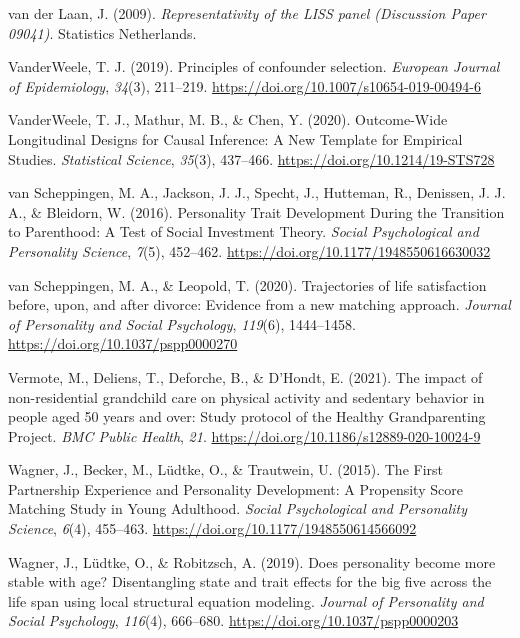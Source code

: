 \documentclass[
  english,
  man, noextraspace,floatsintext]{apa7}
\begin{document}
\leavevmode\hypertarget{ref-vanderlaanRepresentativityLISSPanel2009}{}%
van der Laan, J. (2009). \emph{Representativity of the LISS panel (Discussion Paper 09041)}. Statistics Netherlands.

\leavevmode\hypertarget{ref-vanderweelePrinciplesConfounderSelection2019}{}%
VanderWeele, T. J. (2019). Principles of confounder selection. \emph{European Journal of Epidemiology}, \emph{34}(3), 211--219. \url{https://doi.org/10.1007/s10654-019-00494-6}

\leavevmode\hypertarget{ref-vanderweeleOutcomeWideLongitudinalDesigns2020}{}%
VanderWeele, T. J., Mathur, M. B., \& Chen, Y. (2020). Outcome-Wide Longitudinal Designs for Causal Inference: A New Template for Empirical Studies. \emph{Statistical Science}, \emph{35}(3), 437--466. \url{https://doi.org/10.1214/19-STS728}

\leavevmode\hypertarget{ref-vanscheppingenPersonalityTraitDevelopment2016}{}%
van Scheppingen, M. A., Jackson, J. J., Specht, J., Hutteman, R., Denissen, J. J. A., \& Bleidorn, W. (2016). Personality Trait Development During the Transition to Parenthood: A Test of Social Investment Theory. \emph{Social Psychological and Personality Science}, \emph{7}(5), 452--462. \url{https://doi.org/10.1177/1948550616630032}

\leavevmode\hypertarget{ref-vanscheppingenTrajectoriesLifeSatisfaction2020}{}%
van Scheppingen, M. A., \& Leopold, T. (2020). Trajectories of life satisfaction before, upon, and after divorce: Evidence from a new matching approach. \emph{Journal of Personality and Social Psychology}, \emph{119}(6), 1444--1458. \url{https://doi.org/10.1037/pspp0000270}

\leavevmode\hypertarget{ref-vermoteImpactNonresidentialGrandchild2021a}{}%
Vermote, M., Deliens, T., Deforche, B., \& D'Hondt, E. (2021). The impact of non-residential grandchild care on physical activity and sedentary behavior in people aged 50 years and over: Study protocol of the Healthy Grandparenting Project. \emph{BMC Public Health}, \emph{21}. \url{https://doi.org/10.1186/s12889-020-10024-9}

\leavevmode\hypertarget{ref-wagnerFirstPartnershipExperience2015}{}%
Wagner, J., Becker, M., Lüdtke, O., \& Trautwein, U. (2015). The First Partnership Experience and Personality Development: A Propensity Score Matching Study in Young Adulthood. \emph{Social Psychological and Personality Science}, \emph{6}(4), 455--463. \url{https://doi.org/10.1177/1948550614566092}

\leavevmode\hypertarget{ref-wagnerDoesPersonalityBecome2019}{}%
Wagner, J., Lüdtke, O., \& Robitzsch, A. (2019). Does personality become more stable with age? Disentangling state and trait effects for the big five across the life span using local structural equation modeling. \emph{Journal of Personality and Social Psychology}, \emph{116}(4), 666--680. \url{https://doi.org/10.1037/pspp0000203}
\end{document}
